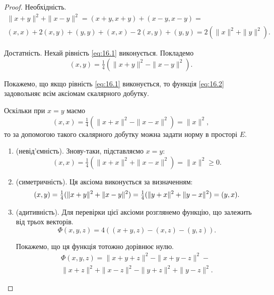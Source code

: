 \begin{proof}
Необхідність.
\begin{multline*}
    \|x + y\|^2 + \|x - y\|^2 =
    (x + y, x + y) + (x - y, x - y) = \\
    (x, x) + 2 (x, y) + (y, y) + (x, x) - 2 (x, y) + (y, y) =
    2 (\|x\|^2 + \|y\|^2).
\end{multline*}

Достатність. Нехай рівність \eqref{eq:16.1} виконується. Покладемо
\begin{equation}
    \label{eq:16.2}
    (x, y) = \tfrac{1}{4} ( \|x + y\|^2 - \|x - y\|^2).
\end{equation}

Покажемо, що якщо рівність \eqref{eq:16.1} виконується, то функція \eqref{eq:16.2}
задовольняє всім аксіомам скалярного добутку.

Оскільки при $x = y$ маємо
\begin{equation*}
    (x, x) = \tfrac{1}{4} ( \|x + x\|^2 - \|x - x\|^2) = \|x\|^2,
\end{equation*}
то за допомогою такого скалярного добутку можна задати
норму в просторі $E$.

\begin{enumerate}
\item (невід’ємність). Знову-таки, підставляємо $x = y$:
\begin{equation*}
    (x, x) = \tfrac{1}{4} (\|x + x\|^2 + \|x - x\|^2) = \|x\|^2 \ge 0.
\end{equation*}

\item (симетричність). Ця аксіома виконується за визначенням:
\begin{equation*}
    (x, y) = \tfrac{1}{4} (\|x + y\|^2 + \|x - y\|^2) = \\
    \tfrac{1}{4} (\|y + x\|^2 + \|y - x\|^2) = (y, x).
\end{equation*}

\item (адитивність). Для перевірки цієї аксіоми
розглянемо функцію, що залежить від трьох векторів.
\begin{equation*}
\Phi(x, y, z) = 4 ((x + y, z) - (x, z) - (y, z)).
\end{equation*}

Покажемо, що ця функція тотожно дорівнює нулю.
\begin{multline}
    \label{eq:16.3}
    \Phi(x, y, z) = \|x + y + z\|^2 - \|x + y - z\|^2 - \\
    \|x + z\|^2 + \|x - z\|^2 - \|y + z\|^2 + \|y - z\|^2.
\end{multline}


\end{enumerate}
\end{proof}
